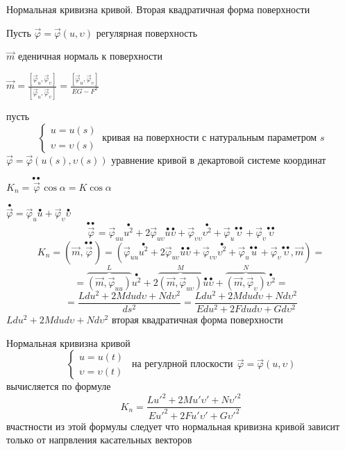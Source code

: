 \begin{title}[\Large]
  Нормальная кривизна кривой. Вторая квадратичная форма поверхности
\end{title}

Пусть $\vec \varphi = \vec \varphi(u, \upsilon)$ регулярная поверхность

$\vec m$ еденичная нормаль к поверхности

$\vec m = \frac{[\vec \varphi_u, \vec \varphi_{\upsilon}]}{[\vec \varphi_u,
\vec \varphi_{\upsilon}]} = \frac{[\vec \varphi_u, \vec \varphi_{\upsilon}]}
{EG - F^2}$

пусть
$$
\left\{
\begin{array}{c}
  u = u(s) \\
  \upsilon = \upsilon(s)
\end{array}
\right. ~ \text{кривая на поверхности с натуральным параметром $s$}
$$
$\vec \varphi = \vec \varphi(u(s), \upsilon(s))$ уравнение кривой в декартовой
системе координат

$K_n = \stackrel{\bullet \bullet}{\vec \varphi} \cos \alpha = K \cos \alpha$

$\stackrel{\bullet}{\vec \varphi} = \vec \varphi_u \stackrel{\bullet}{u} +
\vec \varphi_{\upsilon} \stackrel{\bullet}{\upsilon}$
$$
\stackrel{\bullet \bullet}{\vec \varphi} = \vec \varphi_{uu}
\stackrel{\bullet}{u^2} + 2\vec \varphi_{u\upsilon}\stackrel{\bullet}{u}
\stackrel{\bullet}{\upsilon} + \vec \varphi_{\upsilon \upsilon}
\stackrel{\bullet}{\upsilon^2}
+ \vec \varphi_u \stackrel{\bullet \bullet}{\upsilon} +
\vec \varphi_{\upsilon} \stackrel{\bullet \bullet}{\upsilon}
$$
$$
K_n = (\vec m, \stackrel{\bullet \bullet}{\vec \varphi}) = (\vec \varphi_{uu}
\stackrel{\bullet}{u^2} + 2\vec \varphi_{u\upsilon}\stackrel{\bullet}{u}
\stackrel{\bullet}{\upsilon} + \vec \varphi_{\upsilon \upsilon}
\stackrel{\bullet}{\upsilon^2}
+ \vec \varphi_u \stackrel{\bullet \bullet}{u} +
\vec \varphi_{\upsilon} \stackrel{\bullet \bullet}{\upsilon}, \vec m) =
$$
$$
= \overbrace{(\vec m, \vec \varphi_{uu})}^L \stackrel{\bullet}{u^2} +
2\overbrace{(\vec m, \vec \varphi_{u\upsilon})}^M \stackrel{\bullet}{u}
\stackrel{\bullet}{\upsilon} + \overbrace{(\vec m, \vec \varphi_{\upsilon})}^N
\stackrel{\bullet}{\upsilon^2} =
$$
$$
= \frac{Ldu^2 + 2Mdud\upsilon + Nd\upsilon^2}{ds^2}
= \frac{Ldu^2 + 2Mdud\upsilon + Nd\upsilon^2}{Edu^2 + 2Fdu d\upsilon +
Gd\upsilon^2}
$$
$Ldu^2 + 2Mdud\upsilon + Nd\upsilon^2$ вторая квадратичная форма поверхности

\begin{theorem}
  Нормальная кривизна кривой
  $$
  \left\{
  \begin{array}{c}
    u = u(t) \\
    \upsilon = \upsilon(t)
  \end{array}
  \right. ~~ \text{на регулрной плоскости} ~~ \vec \varphi = \vec \varphi(u,
  \upsilon)
  $$
  вычисляется по формуле
  $$
  K_n = \frac{Lu'^2 + 2Mu'\upsilon' + N\upsilon'^2}{Eu'^2 + 2Fu'\upsilon' +
  G\upsilon'^2}
  $$
  вчастности из этой формулы следует что нормальная кривизна кривой зависит
  только от напрвления касательных векторов
\end{theorem}

